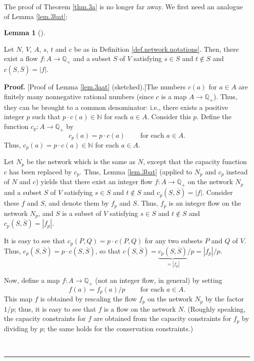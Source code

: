 \documentclass[numbers=enddot,12pt,final,onecolumn,notitlepage]{scrartcl}%
\theoremstyle{definition}
\newtheorem{lem}[theo]{Lemma}
\newenvironment{lemma}[1][]
{\begin{lem}[#1]\begin{leftbar}}
{\end{leftbar}\end{lem}}
\newenvironment{proof}[1][Proof]{\noindent\textbf{#1.} }{\ \rule{0.5em}{0.5em}}
\begin{document}
The proof of Theorem \ref{thm.3a} is no longer far away. We first need an
analogue of Lemma \ref{lem.3bat}:

\begin{lemma}
\label{lem.3aat}Let $N$, $V$, $A$, $s$, $t$ and $c$ be as in Definition
\ref{def.network.notations}. Then, there exist a flow $f:A\rightarrow
\mathbb{Q}_{+}$ and a subset $S$ of $V$ satisfying $s\in S$ and $t\notin S$
and $c\left(  S,\overline{S}\right)  =\left\vert f\right\vert $.
\end{lemma}

\begin{proof}
[Proof of Lemma \ref{lem.3aat} (sketched).]The numbers $c\left(  a\right)  $
for $a\in A$ are finitely many nonnegative rational numbers (since $c$ is a
map $A\rightarrow\mathbb{Q}_{+}$). Thus, they can be brought to a common
denominator: i.e., there exists a positive integer $p$ such that $p\cdot
c\left(  a\right)  \in\mathbb{N}$ for each $a\in A$. Consider this $p$. Define
the function $c_{p}:A\rightarrow\mathbb{Q}_{+}$ by
\[
c_{p}\left(  a\right)  =p\cdot c\left(  a\right)
\ \ \ \ \ \ \ \ \ \ \text{for each }a\in A.
\]
Thus, $c_{p}\left(  a\right)  =p\cdot c\left(  a\right)  \in\mathbb{N}$ for
each $a\in A$.

Let $N_{p}$ be the network which is the same as $N$, except that the capacity
function $c$ has been replaced by $c_{p}$. Thus, Lemma \ref{lem.3bat} (applied
to $N_{p}$ and $c_{p}$ instead of $N$ and $c$) yields that there exist an
integer flow $f:A\rightarrow\mathbb{Q}_{+}$ on the network $N_{p}$ and a
subset $S$ of $V$ satisfying $s\in S$ and $t\notin S$ and $c_{p}\left(
S,\overline{S}\right)  =\left\vert f\right\vert $. Consider these $f$ and $S$,
and denote them by $f_{p}$ and $S$. Thus, $f_{p}$ is an integer flow on the
network $N_{p}$, and $S$ is a subset of $V$ satisfying $s\in S$ and $t\notin
S$ and $c_{p}\left(  S,\overline{S}\right)  =\left\vert f_{p}\right\vert $.

It is easy to see that $c_{p}\left(  P,Q\right)  =p\cdot c\left(  P,Q\right)
$ for any two subsets $P$ and $Q$ of $V$. Thus, $c_{p}\left(  S,\overline
{S}\right)  =p\cdot c\left(  S,\overline{S}\right)  $, so that $c\left(
S,\overline{S}\right)  =\underbrace{c_{p}\left(  S,\overline{S}\right)
}_{=\left\vert f_{p}\right\vert }/p=\left\vert f_{p}\right\vert /p$.

Now, define a map $f:A\rightarrow\mathbb{Q}_{+}$ (not an integer flow, in
general) by setting%
\[
f\left(  a\right)  =f_{p}\left(  a\right)  /p\ \ \ \ \ \ \ \ \ \ \text{for
each }a\in A.
\]
This map $f$ is obtained by rescaling the flow $f_{p}$ on the network $N_{p}$
by the factor $1/p$; thus, it is easy to see that $f$ is a flow on the network
$N$. (Roughly speaking, the capacity constraints for $f$ are obtained from the
capacity constraints for $f_{p}$ by dividing by $p$; the same holds for the
conservation constraints.)


\end{proof}
\end{document}
